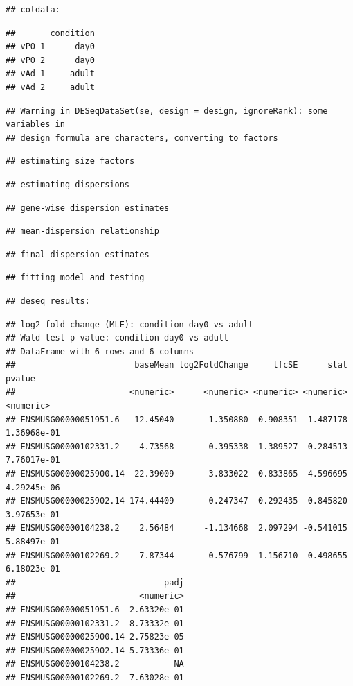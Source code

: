 \documentclass[
]{article}
\begin{document}
\begin{verbatim}
## coldata:
\end{verbatim}

\begin{verbatim}
##       condition
## vP0_1      day0
## vP0_2      day0
## vAd_1     adult
## vAd_2     adult
\end{verbatim}

\begin{verbatim}
## Warning in DESeqDataSet(se, design = design, ignoreRank): some variables in
## design formula are characters, converting to factors
\end{verbatim}

\begin{verbatim}
## estimating size factors
\end{verbatim}

\begin{verbatim}
## estimating dispersions
\end{verbatim}

\begin{verbatim}
## gene-wise dispersion estimates
\end{verbatim}

\begin{verbatim}
## mean-dispersion relationship
\end{verbatim}

\begin{verbatim}
## final dispersion estimates
\end{verbatim}

\begin{verbatim}
## fitting model and testing
\end{verbatim}

\begin{verbatim}
## deseq results:
\end{verbatim}

\begin{verbatim}
## log2 fold change (MLE): condition day0 vs adult 
## Wald test p-value: condition day0 vs adult 
## DataFrame with 6 rows and 6 columns
##                        baseMean log2FoldChange     lfcSE      stat      pvalue
##                       <numeric>      <numeric> <numeric> <numeric>   <numeric>
## ENSMUSG00000051951.6   12.45040       1.350880  0.908351  1.487178 1.36968e-01
## ENSMUSG00000102331.2    4.73568       0.395338  1.389527  0.284513 7.76017e-01
## ENSMUSG00000025900.14  22.39009      -3.833022  0.833865 -4.596695 4.29245e-06
## ENSMUSG00000025902.14 174.44409      -0.247347  0.292435 -0.845820 3.97653e-01
## ENSMUSG00000104238.2    2.56484      -1.134668  2.097294 -0.541015 5.88497e-01
## ENSMUSG00000102269.2    7.87344       0.576799  1.156710  0.498655 6.18023e-01
##                              padj
##                         <numeric>
## ENSMUSG00000051951.6  2.63320e-01
## ENSMUSG00000102331.2  8.73332e-01
## ENSMUSG00000025900.14 2.75823e-05
## ENSMUSG00000025902.14 5.73336e-01
## ENSMUSG00000104238.2           NA
## ENSMUSG00000102269.2  7.63028e-01
\end{verbatim}
\end{document}
